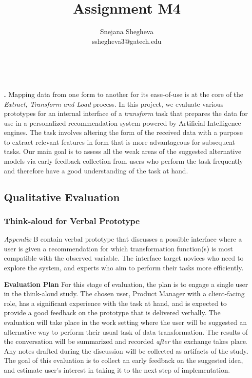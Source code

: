 \documentclass[12pt,letterpaper]{article}
\makeatletter
\renewcommand{\maketitle}{\bgroup
   \begin{center}
   \textbf{{\fontsize{18pt}{20}\selectfont \@title}}\\
   \vspace{10pt}
   {\fontsize{12pt}{0}\selectfont \@author} 
   \end{center}
}
\newenvironment{myquote}[1]%
  {\list{}{\leftmargin=#1\rightmargin=#1}\item[]}%
  {\endlist}
\renewenvironment{abstract}
{\vspace*{-.5in}\fontsize{12pt}{12}\begin{myquote}{.5in}
\noindent \par{\bfseries \abstractname.}}
{\medskip\noindent
\end{myquote}
}
\makeatother
\begin{document}
\title{Assignment M4}
\author{Snejana Shegheva \\ sshegheva3@gatech.edu}

\maketitle
\thispagestyle{fancy}

\begin{abstract}
Mapping data from one form to another for its ease-of-use is at the core of the \textit{Extract, Transform and Load} process. In this project, we evaluate various prototypes for an internal interface of a \textit{transform} task that prepares the data for use in a personalized recommendation system powered by Artificial Intelligence engines. The task involves altering the form of the received data with a purpose to extract relevant features in form that is more advantageous for subsequent tasks. Our main goal is to assess all the weak areas of the suggested alternative models via early feedback collection from users who perform the task frequently and therefore have a good understanding of the task at hand.  
\end{abstract}

\subsection*{Qualitative Evaluation}
\subsubsection*{Think-aloud for Verbal Prototype}
\textit{Appendix} B contain verbal prototype that discusses a possible interface where a user is given a recommendation for which transformation function(s) is most compatible with the observed variable. The interface target novices who need to explore the system, and experts who aim to perform their tasks more efficiently.

\textbf{Evaluation Plan}
For this stage of evaluation, the plan is to engage a single user in the think-aloud study. The chosen user, Product Manager with a client-facing role, has a significant experience with the task at hand, and is expected to provide a good feedback on the prototype that is delivered verbally. The evaluation will take place in the work setting where the user will be suggested an alternative way to perform their usual task of data transformation. The results of the conversation will be summarized and recorded \textit{after} the exchange takes place. Any notes drafted during the discussion will be collected as artifacts of the study. The goal of this evaluation is to collect an early feedback on the suggested idea, and estimate user's interest in taking it to the next step of implementation.
\end{document}
